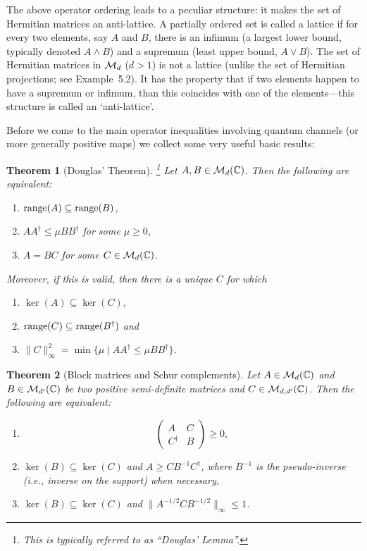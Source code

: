 \documentclass[11pt,a4paper]{article}
\theoremstyle{plain}
\newtheorem{theorem}{Theorem}[section]
\theoremstyle{definition}
\theoremstyle{remark}
\numberwithin{equation}{section}
\begin{document}
The above operator ordering leads to a peculiar structure: it makes the set of
Hermitian matrices an anti-lattice. A partially ordered set is called a lattice if for
every two elements, say $A$ and $B$, there is an infimum (a largest lower bound,
typically denoted $A\wedge B$) and a supremum (least upper bound, $A\vee B$).
The set of Hermitian matrices in $\mathcal{M}_d$ ($d>1$) is not a lattice (unlike the set
of Hermitian projections; see Example~5.2). It has the property that if two elements
happen to have a supremum or infimum, than this coincides with one of the
elements---this structure is called an `anti-lattice'.

Before we come to the main operator inequalities involving quantum channels (or
more generally positive maps) we collect some very useful basic results:

\begin{theorem}[Douglas' Theorem]\leavevmode\footnote{This is typically referred to as ``Douglas' Lemma''.}
    Let $A,B\in \mathcal{M}_d(\mathbb{C})$. Then the following are equivalent:
    \begin{enumerate}
        \item $\operatorname{range}(A)\subseteq \operatorname{range}(B)$,
        \item $AA^\dagger \le \mu BB^\dagger$ for some $\mu\ge 0$,
        \item $A = BC$ for some $C\in \mathcal{M}_d(\mathbb{C})$.
    \end{enumerate}
    Moreover, if this is valid, then there is a unique $C$ for which
    \begin{enumerate}
        \item[(i)] $\ker(A)\subseteq \ker(C)$,
        \item[(ii)] $\operatorname{range}(C)\subseteq \operatorname{range}(B^\dagger)$ and
        \item[(iii)] $\|C\|_\infty^2=\min\{\mu \mid AA^\dagger \le \mu BB^\dagger\}$.
    \end{enumerate}
\end{theorem}

\begin{theorem}[Block matrices and Schur complements]
    Let $A\in \mathcal{M}_d(\mathbb{C})$ and $B\in \mathcal{M}_{d'}(\mathbb{C})$ be two positive semi-definite
    matrices and $C\in \mathcal{M}_{d,d'}(\mathbb{C})$. Then the following are equivalent:
    \begin{enumerate}
        \item
              \[
                  \begin{pmatrix}
                      A         &C\\
                      C^\dagger &B
                  \end{pmatrix} \ge 0,
              \]
        \item $\ker(B)\subseteq \ker(C)$ and $A \ge C B^{-1}C^\dagger$, where $B^{-1}$ is
              the pseudo-inverse (i.e., inverse on the support) when necessary,
        \item $\ker(B)\subseteq \ker(C)$ and $\|A^{-1/2} C B^{-1/2}\|_\infty \le 1$.
    \end{enumerate}
\end{theorem}
\end{document}
